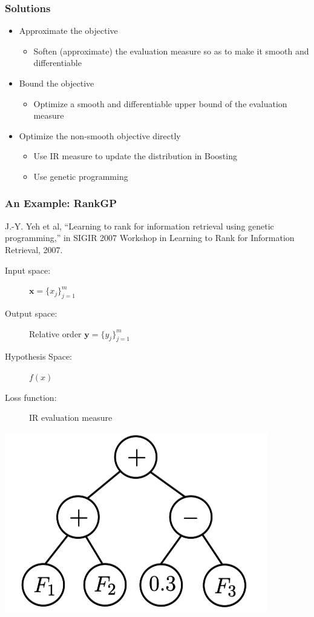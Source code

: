 \documentclass{beamer}
\begin{document}
\begin{frame}
    \frametitle{Solutions}
    \begin{itemize}
    \item Approximate the objective
        \begin{itemize}
        \item Soften (approximate) the evaluation measure so as to make it
            smooth and differentiable
        \end{itemize}
    \item Bound the objective
        \begin{itemize}
        \item Optimize a smooth and differentiable upper bound of the
            evaluation measure
        \end{itemize}
    \item Optimize the non-smooth objective directly
        \begin{itemize}
        \item Use IR measure to update the distribution in Boosting
        \item Use genetic programming
        \end{itemize}
    \end{itemize}
\end{frame}

\begin{frame}
    \frametitle{An Example: RankGP}
    \begin{minipage}{1.0\linewidth}
        \footnotesize J.-Y. Yeh et al, ``Learning to rank for information
        retrieval using genetic programming,'' in SIGIR 2007 Workshop in
        Learning to Rank for Information Retrieval, 2007.
    \end{minipage}
    \vfill
    \begin{description}
    \item[Input space:] $\mathbf{x} = \{x_j\}_{j=1}^m$
    \item[Output space:] Relative order $\mathbf{y} = \{y_j\}_{j=1}^m$
    \item[Hypothesis Space:] $f(x)$ 
    \item[Loss function:] IR evaluation measure
    \end{description}
    \begin{center}
        \includegraphics[scale=.3]{gprank}
    \end{center}
\end{frame}
\end{document}
